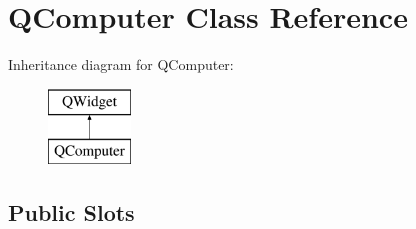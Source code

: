 \hypertarget{class_q_computer}{}\section{Q\+Computer Class Reference}
\label{class_q_computer}
Inheritance diagram for Q\+Computer\+:\begin{figure}[H]
\begin{center}
\leavevmode
\includegraphics[height=2.000000cm]{class_q_computer}
\end{center}
\end{figure}
\subsection*{Public Slots}
